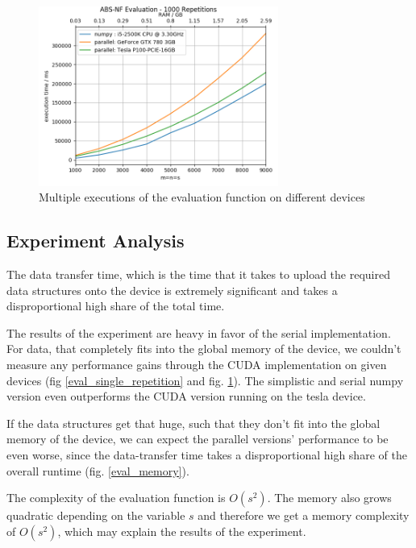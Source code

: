 \begin{figure}[ht]
	\centering
	\includegraphics[width=0.7\textwidth]{img/eval_mult_repetition.png}
	\caption{Multiple executions of the evaluation function on different devices}
	\label{eval_1000}
\end{figure}

\subsection{Experiment Analysis}

The data transfer time, which is the time that it takes to upload the required data structures onto the device is extremely significant and takes a disproportional high share of the total time.

The results of the experiment are heavy in favor of the serial implementation.\\
For data, that completely fits into the global memory of the device, we couldn't measure any performance gains through the CUDA implementation on given devices (fig \ref{eval_single_repetition} and  fig. \ref{eval_1000}). The simplistic and serial numpy version even outperforms the CUDA version running on the tesla device.

If the data structures get that huge, such that they don't fit into the global memory of the device, we can expect the parallel versions' performance to be even worse, since the data-transfer time takes a disproportional high share of the overall runtime (fig. \ref{eval_memory}).

The complexity of the evaluation function is $O(s^2)$. The memory also grows quadratic depending on the variable $s$ and therefore we get a memory complexity of $O(s^2)$, which may explain the results of the experiment.

